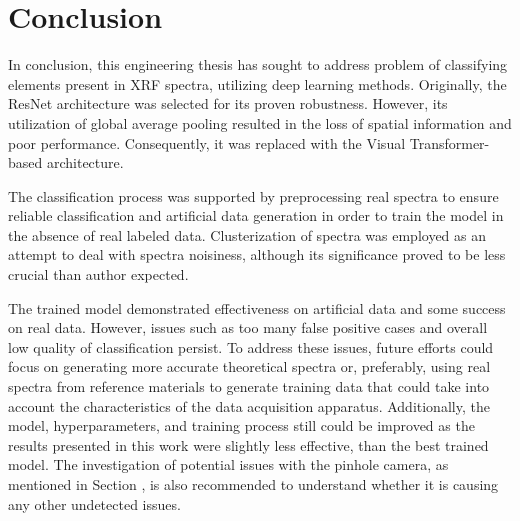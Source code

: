 \section{Conclusion}
In conclusion, this engineering thesis has sought to address problem of classifying elements present in XRF spectra, utilizing deep learning methods.
Originally, the ResNet architecture was selected for its proven robustness. 
However, its utilization of global average pooling resulted in the loss of spatial information and poor performance. 
Consequently, it was replaced with the Visual Transformer-based architecture.

The classification process was supported by preprocessing real spectra to ensure reliable classification and artificial data generation in order to train the model in the absence of real labeled data. 
Clusterization of spectra was employed as an attempt to deal with spectra noisiness, although its significance proved to be less crucial than author expected.

The trained model demonstrated effectiveness on artificial data and some success on real data. 
However, issues such as too many false positive cases and overall low quality of classification persist. 
To address these issues, future efforts could focus on generating more accurate theoretical spectra or, preferably, using real spectra from reference materials to generate training data that could take into account the characteristics of the data acquisition apparatus.
Additionally, the model, hyperparameters, and training process still could be improved as the results presented in this work were slightly less effective, than the best trained model. 
The investigation of potential issues with the pinhole camera, as mentioned in Section , is also recommended to understand whether it is causing any other undetected issues.



